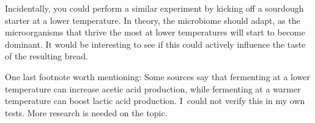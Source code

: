Incidentally, you could perform a similar experiment by kicking off a sourdough
starter at a lower temperature. In theory, the microbiome should adapt, as the
microorganisms that thrive the most at lower temperatures will start to become
dominant. It would be interesting to see if this could actively influence the
taste of the resulting bread.

One last footnote worth mentioning: Some sources say that fermenting at a
lower temperature can increase acetic acid production, while fermenting at a
warmer temperature can boost lactic acid production. I~could not verify this
in my own tests. More research is needed on the topic.
